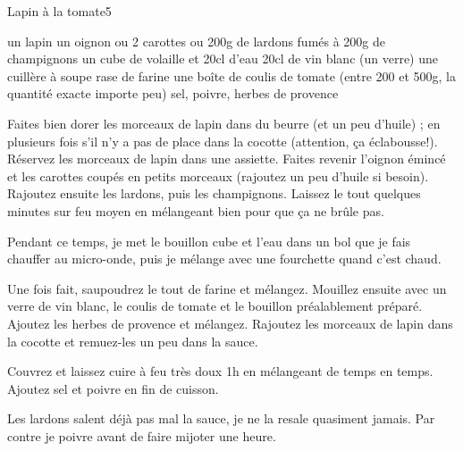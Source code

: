 \begin{recette}{Lapin à la tomate}{5}{}{}
\begin{ingredients}[4 pers.]
\ingredient un lapin
\ingredient un oignon
 ou 2 carottes
 ou 200g de lardons fumés
 à 200g de champignons
\ingredient un cube de volaille et 20cl d'eau
\ingredient 20cl de vin blanc (un verre)
\ingredient une cuillère à soupe rase de farine
\ingredient une boîte de coulis de tomate (entre 200 et 500g, la quantité exacte importe peu)
\ingredient sel, poivre, herbes de provence
\end{ingredients}

\begin{preparation}
\etape Faites bien dorer les morceaux de lapin dans du beurre (et un peu d'huile) ; en plusieurs fois s'il n'y a pas de place dans la cocotte (attention, ça éclabousse!).
\etape Réservez les morceaux de lapin dans une assiette.
\etape Faites revenir l'oignon émincé et les carottes coupés en petits morceaux (rajoutez un peu d'huile si besoin).
\etape Rajoutez ensuite les lardons, puis les champignons.
\etape Laissez le tout quelques minutes sur feu moyen en mélangeant bien pour que ça ne brûle pas.
\begin{remarque}
Pendant ce temps, je met le bouillon cube et l'eau dans un bol que je fais chauffer au micro-onde, puis je mélange avec une fourchette quand c'est chaud.
\end{remarque}
\etape Une fois fait, saupoudrez le tout de farine et mélangez. 
\etape Mouillez ensuite avec un verre de vin blanc, le coulis de tomate et le bouillon préalablement préparé. Ajoutez les herbes de provence et mélangez.
\etape Rajoutez les morceaux de lapin dans la cocotte et remuez-les un peu dans la sauce.
\end{preparation}

\begin{cuisson}
Couvrez et laissez cuire à feu très doux 1h en mélangeant de temps en temps. Ajoutez sel et poivre en fin de cuisson.
\begin{remarque}
Les lardons salent déjà pas mal la sauce, je ne la resale quasiment jamais. Par contre je poivre avant de faire mijoter une heure.
\end{remarque}
\end{cuisson}
\end{recette}

